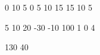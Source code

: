 \begin{myverbbox}[\small]{\voutput}
    0 10
    5 0
    5 10
    15 15
    10 5
\end{myverbbox}


\begin{myverbbox}[\small]{\vinput}
    5
    10 20 -30 -10 100
    1
    0 4
\end{myverbbox}

\begin{myverbbox}[\small]{\voutput}
    130 40
\end{myverbbox}

